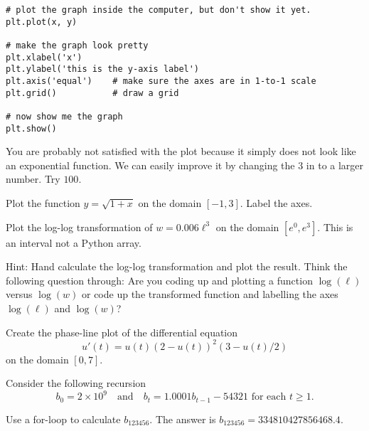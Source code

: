 \documentclass[../main.tex]{subfiles}
\begin{document}
\begin{enumerate}
\begin{verbatim}
# plot the graph inside the computer, but don't show it yet.
plt.plot(x, y)

# make the graph look pretty
plt.xlabel('x')
plt.ylabel('this is the y-axis label')
plt.axis('equal')    # make sure the axes are in 1-to-1 scale
plt.grid()           # draw a grid

# now show me the graph
plt.show()
    \end{verbatim}

    You are probably not satisfied with the plot because it simply does not look like an exponential function.  We can easily improve it by changing the \(3\) in  to a larger number. Try \(100\). 

\end{enumerate}

\begin{example}
  Plot the function \(y = \sqrt{1 + x}\) on the domain \([-1,3]\). Label the axes.
\end{example}

\begin{example}
  Plot the log-log transformation of \(w = 0.006 \ell^{3}\) on the domain \([e^{0}, e^{3}]\). This is an interval not a Python array.

  Hint: Hand calculate the log-log transformation and plot the result.  Think the following question through: Are you coding up and plotting a function \(\log(\ell)\) versus \(\log(w)\) or code up the transformed function and labelling the axes \(\log(\ell)\) and \(\log(w)\)?

\end{example}

\begin{example}
  Create the phase-line plot of the differential equation 
  \[
    u'(t) = u(t) (2 - u(t))^{2}(3 - u(t)/2)
  \]
  on the domain \([0, 7]\).
\end{example}


\begin{example}
  Consider the following recursion
  \[
    b_{0} = 2 \times 10^{9} \quad\text{and}\quad b_{t} = 1.0001 b_{t-1} - 54321 \text{ for each } t \ge 1.
  \]

  Use a for-loop to calculate \(b_{123456}\).  The answer is \(b_{123456} = 334810427856468.4\).
\end{example}
\clearpage
\end{document}
